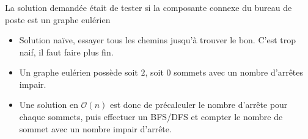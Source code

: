 \begin{frame}
    \frametitle{\problemtitle}
    La solution demandée était de tester si la composante connexe du bureau de poste est un graphe eulérien
    \begin{itemize}
        \item<+-> Solution naïve, essayer tous les chemins jusqu'à trouver le bon. C'est trop naif, il faut faire plus fin.
        \item<+-> Un graphe eulérien possède soit $2$, soit $0$ sommets avec un nombre d'arrêtes impair. 
        \item<+-> Une solution en $\mathcal{O}(n)$ est donc de précalculer le nombre d'arrête pour chaque sommets, puis effectuer un BFS/DFS et compter le nombre de sommet avec un nombre impair d'arrête.
    \end{itemize}
\end{frame}
